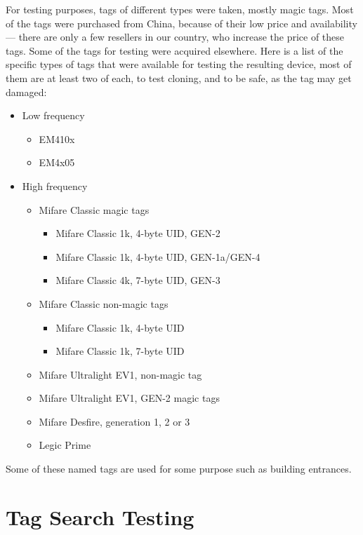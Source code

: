 For testing purposes, tags of different types were taken, mostly magic tags. Most of the tags were purchased from China, because of their low price and availability --- there are only a few resellers in our country, who increase the price of these tags. Some of the tags for testing were acquired elsewhere. Here is a list of the specific types of tags that were available for testing the resulting device, most of them are at least two of each, to test cloning, and to be safe, as the tag may get damaged:
\begin{itemize}
    \item Low frequency
    \begin{itemize}
        \item EM410x
        \item EM4x05
    \end{itemize}
    \item High frequency
    \begin{itemize}
        \item Mifare Classic magic tags
        \begin{itemize}
            \item Mifare Classic 1k, 4-byte UID, GEN-2
            \item Mifare Classic 1k, 4-byte UID, GEN-1a/GEN-4
            \item Mifare Classic 4k, 7-byte UID, GEN-3
        \end{itemize}
        \item Mifare Classic non-magic tags
        \begin{itemize}
            \item Mifare Classic 1k, 4-byte UID
            \item Mifare Classic 1k, 7-byte UID
        \end{itemize}
        \item Mifare Ultralight EV1, non-magic tag
        \item Mifare Ultralight EV1, GEN-2 magic tags
        \item Mifare Desfire, generation 1, 2 or 3
        \item Legic Prime
    \end{itemize}
\end{itemize}
Some of these named tags are used for some purpose such as building entrances.

\section{Tag Search Testing}

